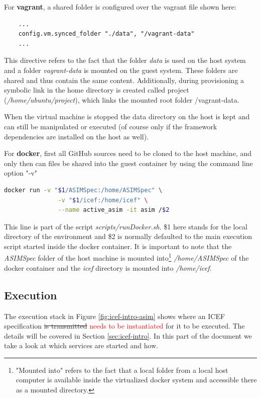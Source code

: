 For \textbf{vagrant}, a shared folder is configured over the vagrant file shown here:
\begin{lstlisting}
	...
	config.vm.synced_folder "./data", "/vagrant-data"
	...
\end{lstlisting}
This directive refers to the fact that the folder \textit{data} is used on the host system and a folder \textit{vagrant-data} is mounted on the guest system. These folders are shared and thus contain the same content. Additionally, during provisioning a symbolic link in the home directory is created called project (\textit{/home/ubuntu/project}), which links the mounted root folder /vagrant-data.

When the virtual machine is stopped the data directory on the host is kept and can still be manipulated or executed (of course only if the framework dependencies are installed on the host as well).

For \textbf{docker}, first all GitHub sources need to be cloned to the host machine, and only then can files be shared into the guest container by using the command line option "-v"
\begin{lstlisting}[language=bash]
	docker run -v "$1/ASIMSpec:/home/ASIMSpec" \
	           -v "$1/icef:/home/icef" \
	           --name active_asim -it asim /$2
\end{lstlisting}

This line is part of the script \textit{scripts/runDocker.sh}. \$1 here stands for the local directory of the environment and \$2 is normally defaulted to the main execution script started inside the docker container. It is important to note that the \textit{ASIMSpec} folder of the host machine is mounted into\footnote{"Mounted into" refers to the fact that a local folder from a local host computer is available inside the virtualized docker system and accessible there as a mounted directory.} \textit{/home/ASIMSpec} of the docker container and the \textit{icef} directory is mounted into \textit{/home/icef}.

\subsection{Execution}
\label{sec:env-exec-stack-exe}

The execution stack in Figure \ref{fig:icef-intro-asim} shows where an ICEF specification \st{is transmitted} \textcolor{red}{needs to be instantiated} for it to be executed. The details will be covered in Section \ref{sec:icef-intro}. In this part of the document we take a look at which services are started and how.

